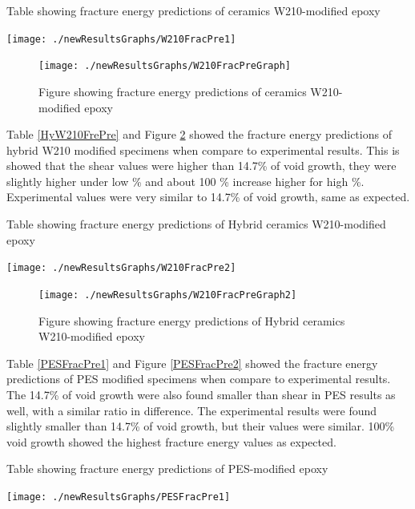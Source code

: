 \documentclass[numbers=noendperiod,chapterprefix=on]{icldt} %
\begin{document}
\begin{table}[!htpb]
\centering
\caption{Table showing fracture energy predictions of ceramics W210-modified epoxy} \label{W210FrePre}
\texttt{[image: ./newResultsGraphs/W210FracPre1]}
\end{table}
\FloatBarrier

\begin{figure}[!t]
\centering
\texttt{[image: ./newResultsGraphs/W210FracPreGraph]}
\caption{Figure showing fracture energy predictions of ceramics W210-modified epoxy}
\label{W210FrePre2}
\end{figure}
\FloatBarrier

Table \ref{HyW210FrePre} and Figure \ref{HyW210FrePre2} showed the fracture energy predictions of hybrid W210 modified specimens when compare to experimental results. This is showed that the shear values were higher than 14.7\% of void growth, they were slightly higher under low \% and about 100 \% increase higher for high \%. Experimental values were very similar to 14.7\% of void growth, same as expected. 

\begin{table}[!htpb]
\centering
\caption{Table showing fracture energy predictions of Hybrid ceramics W210-modified epoxy} \label{HyW210FrePre}
\texttt{[image: ./newResultsGraphs/W210FracPre2]}
\end{table}
\FloatBarrier

\begin{figure}[!hp]
\centering
\texttt{[image: ./newResultsGraphs/W210FracPreGraph2]}
\caption{Figure showing fracture energy predictions of Hybrid ceramics W210-modified epoxy}
\label{HyW210FrePre2}
\end{figure}
\FloatBarrier

Table \ref{PESFracPre1} and Figure \ref{PESFracPre2} showed the fracture energy predictions of PES modified specimens when compare to experimental results. The 14.7\% of void growth were also found smaller than shear in PES results as well, with a similar ratio in difference. The experimental results were found slightly smaller than 14.7\% of void growth, but their values were similar. 100\% void growth showed the highest fracture energy values as expected.

\begin{table}[!htpb]
\centering
\caption{Table showing fracture energy predictions of PES-modified epoxy} 
\texttt{[image: ./newResultsGraphs/PESFracPre1]}
\label{PESFracPre1}
\end{table}
\FloatBarrier
\end{document}
